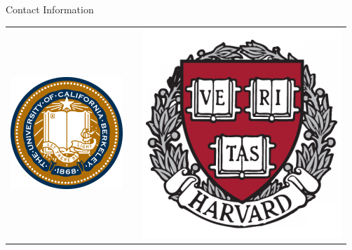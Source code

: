 \documentclass[final]{beamer}
\newlength{\onecolwid}
\begin{document}
\begin{frame}[t]
\begin{columns}[t]
\begin{column}{\onecolwid}
\begin{alertblock}{Contact Information}
\end{alertblock}

\begin{center}
\begin{tabular}{ccc}
\includegraphics[width=0.3\linewidth]{UC_Berkeley_Seal_80px.jpg} & \hfill & \includegraphics[width=0.3\linewidth]{harvard_shield_wreath-284x300.png}
\end{tabular}
\end{center}


\end{column} %

\end{columns} %

\end{frame} %
\end{document}
